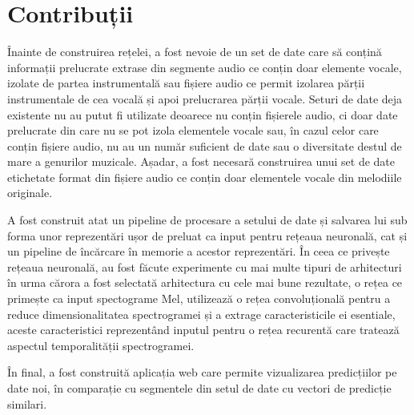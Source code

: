 \chapter{Contribuții}

Înainte de construirea rețelei, a fost nevoie de un set de date care să conțină informații prelucrate extrase din segmente
 audio ce conțin doar elemente vocale, izolate de partea instrumentală sau fișiere audio ce permit izolarea părții
 instrumentale de cea vocală și apoi prelucrarea părții vocale. Seturi de date deja existente nu au putut fi utilizate
 deoarece nu conțin fișierele audio, ci doar date prelucrate din care nu se pot izola elementele vocale sau, în cazul
 celor care conțin fișiere audio, nu au un număr suficient de date sau o diversitate destul de mare a genurilor muzicale.
 Așadar, a fost necesară construirea unui set de date etichetate format din fișiere audio ce conțin doar elementele vocale
 din melodiile originale.

A fost construit atat un pipeline de procesare a setului de date și salvarea lui sub forma unor reprezentări ușor de
 preluat ca input pentru rețeaua neuronală, cat și un pipeline de încărcare în memorie a acestor reprezentări. În ceea
 ce privește rețeaua neuronală, au fost făcute experimente cu mai multe tipuri de arhitecturi în urma cărora a fost
 selectată arhitectura cu cele mai bune rezultate, o rețea ce primește ca input spectograme Mel, utilizează o rețea
 convoluțională pentru a reduce dimensionalitatea spectrogramei și a extrage caracteristicile ei esentiale, aceste
 caracteristici reprezentând inputul pentru o rețea recurentă care tratează aspectul temporalității spectrogramei.

În final, a fost construită aplicația web care permite vizualizarea predicțiilor pe date noi, în comparație cu segmentele
 din setul de date cu vectori de predicție similari. 
